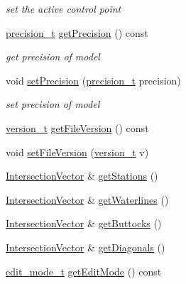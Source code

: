 \begin{DoxyCompactItemize}
\begin{DoxyCompactList}\small\item\em set the active control point \end{DoxyCompactList}\item 
\hyperlink{namespaceShipCAD_ae13c7e36dfb1e2300741a631041cd915}{precision\+\_\+t} \hyperlink{classShipCAD_1_1ShipCADModel_a0835431712a18b9f83e64135486c1403}{get\+Precision} () const 
\begin{DoxyCompactList}\small\item\em get precision of model \end{DoxyCompactList}\item 
void \hyperlink{classShipCAD_1_1ShipCADModel_a6133fe12cd13b6ce24424e19a8b1e433}{set\+Precision} (\hyperlink{namespaceShipCAD_ae13c7e36dfb1e2300741a631041cd915}{precision\+\_\+t} precision)
\begin{DoxyCompactList}\small\item\em set precision of model \end{DoxyCompactList}\item 
\hyperlink{namespaceShipCAD_af3a6fa23a7318acbda7b0066b53d694f}{version\+\_\+t} \hyperlink{classShipCAD_1_1ShipCADModel_a837f41ecb002cd0e197d365edbef3d52}{get\+File\+Version} () const 
\item 
void \hyperlink{classShipCAD_1_1ShipCADModel_a44ac7a48c0c01cae73bf723120071e72}{set\+File\+Version} (\hyperlink{namespaceShipCAD_af3a6fa23a7318acbda7b0066b53d694f}{version\+\_\+t} v)
\item 
\hyperlink{namespaceShipCAD_a9910f0963197f9df6125398efd4fa139}{Intersection\+Vector} \& \hyperlink{classShipCAD_1_1ShipCADModel_a86da3ca66e90403ead21ccc67f584c52}{get\+Stations} ()
\item 
\hyperlink{namespaceShipCAD_a9910f0963197f9df6125398efd4fa139}{Intersection\+Vector} \& \hyperlink{classShipCAD_1_1ShipCADModel_a6c147a75fa02e43145de346efb9542fd}{get\+Waterlines} ()
\item 
\hyperlink{namespaceShipCAD_a9910f0963197f9df6125398efd4fa139}{Intersection\+Vector} \& \hyperlink{classShipCAD_1_1ShipCADModel_a8908d7adff0b1aa1ed118103c02c5402}{get\+Buttocks} ()
\item 
\hyperlink{namespaceShipCAD_a9910f0963197f9df6125398efd4fa139}{Intersection\+Vector} \& \hyperlink{classShipCAD_1_1ShipCADModel_a19864f7628c596553f7c89247715b10a}{get\+Diagonals} ()
\item 
\hyperlink{namespaceShipCAD_a66144e3f3a53da01f51c9bdb94fcae31}{edit\+\_\+mode\+\_\+t} \hyperlink{classShipCAD_1_1ShipCADModel_a636a331e17c59db296527d1aca0ad01d}{get\+Edit\+Mode} () const 

\end{DoxyCompactItemize}
